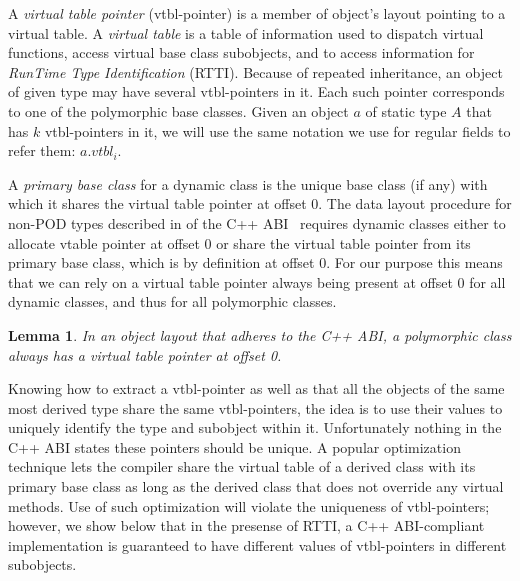 \documentclass[preprint]{sigplanconf}
\makeatletter
\DeclareRobustCommand{\code}[1]{{\lstinline[breaklines=false,escapechar=@]{#1}}}
\newtheorem{lemma}{Lemma}
\makeatother
\begin{document}
A \emph{virtual table pointer} (vtbl-pointer) is a member of object's layout 
pointing to a virtual table. A \emph{virtual table} is a table of information used 
to dispatch virtual functions, access virtual base class subobjects, and to 
access information for \emph{RunTime Type Identification} (RTTI). Because of repeated
inheritance, an object of given type may have several vtbl-pointers in it. Each 
such pointer corresponds to one of the polymorphic base classes. Given an object 
$a$ of static type $A$ that has $k$ vtbl-pointers in it, we will use the same 
notation we use for regular fields to refer them: $a.\textit{vtbl}_i$.

A \emph{primary base class} for a dynamic class is the unique base class (if any) 
with which it shares the virtual table pointer at offset 0. The data layout 
procedure for non-POD types described in  of the C++ ABI~\cite{C++ABI} 
requires dynamic classes either to allocate vtable pointer at offset 0 or share 
the virtual table pointer from its primary base class, which is by definition at 
offset 0. For our purpose this means that we can rely on a virtual table pointer 
always being present at offset 0 for all dynamic classes, and thus for all polymorphic 
classes.

\begin{lemma}
In an object layout that adheres to the C++ ABI, a polymorphic class always has a 
virtual table pointer at offset 0.
\label{lem:vtbl}
\end{lemma}

\noindent
Knowing how to extract a vtbl-pointer as well as that all the objects of the 
same most derived type share the same vtbl-pointers, the idea is to use their 
values to uniquely identify the type and subobject within it. Unfortunately 
nothing in the C++ ABI states these pointers should be unique. A popular 
optimization technique lets the compiler share the virtual table of a derived 
class with its primary base class as long as the derived class that does not 
override any virtual methods. Use of such optimization will violate the 
uniqueness of vtbl-pointers; however, we show below that in the presense of 
RTTI, a C++ ABI-compliant implementation is guaranteed to have different values 
of vtbl-pointers in different subobjects.

\end{document}
